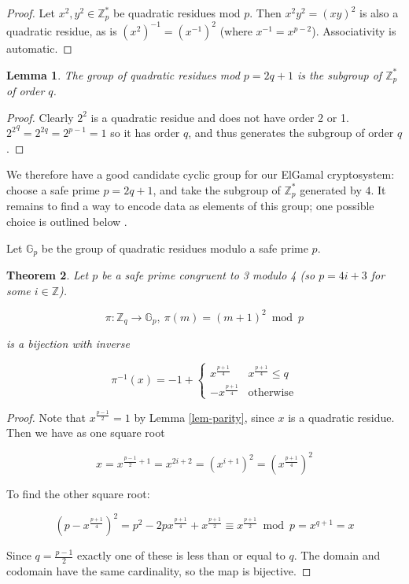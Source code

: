 \documentclass[11pt,twoside,a4paper]{article}
\newtheorem{theorem}{Theorem}[section]
\newtheorem{lemma}[theorem]{Lemma}
\theoremstyle{definition}
\begin{document}
\begin{proof}
    Let \(x^2,y^2\in\mathbb{Z}^*_p\) be quadratic residues mod \(p\). Then \(x^2y^2=(xy)^2\) is also a quadratic residue, as is \((x^2)^{-1}=(x^{-1})^2\) (where \(x^{-1}=x^{p-2}\)). Associativity is automatic.
\end{proof}
\begin{lemma}
    The group of quadratic residues mod \(p=2q+1\) is the subgroup of \(\mathbb{Z}^*_p\) of order \(q\).
\end{lemma}
\begin{proof}
    Clearly \(2^2\) is a quadratic residue and does not have order 2 or 1. \({2^2}^q=2^{2q}=2^{p-1}=1\) so it has order \(q\), and thus generates the subgroup of order \(q\).
\end{proof}
We therefore have a good candidate cyclic group for our ElGamal cryptosystem: choose a safe prime \(p=2q+1\), and take the subgroup of \(\mathbb{Z}^*_p\) generated by \(4\). It remains to find a way to encode data as elements of this group; one possible choice is outlined below \cite{katz2014introduction}.

Let \(\mathbb{G}_p\) be the group of quadratic residues modulo a safe prime \(p\).
\begin{theorem}
    Let \(p\) be a safe prime congruent to 3 modulo 4 (so \(p=4i+3\) for some \(i\in\mathbb{Z}\)).

    \[\pi:\mathbb{Z}_q\rightarrow\mathbb{G}_p,\ \pi(m)=(m+1)^2\bmod p\]

    is a bijection with inverse

    \[\pi^{-1}(x)=-1+\begin{cases}
        x^\frac{p+1}{4} & x^\frac{p+1}{4}\leq q\\
        -x^\frac{p+1}{4}&\text{otherwise}
    \end{cases}\]

\end{theorem}
\begin{proof}
    Note that \(x^\frac{p-1}{2}=1\) by Lemma \ref{lem-parity}, since \(x\) is a quadratic residue. Then we have as one square root

    \[x=x^{\frac{p-1}{2}+1}=x^{2i+2}=(x^{i+1})^2=\left(x^\frac{p+1}{4}\right)^2\]

    To find the other square root:

    \[\left(p-x^\frac{p+1}{4}\right)^2=p^2-2px^\frac{p+1}{4}+x^\frac{p+1}{2}\equiv x^\frac{p+1}{2}\bmod p=x^{q+1}=x\]

    Since \(q=\frac{p-1}{2}\) exactly one of these is less than or equal to \(q\). The domain and codomain have the same cardinality, so the map is bijective.



\end{proof}
\end{document}
